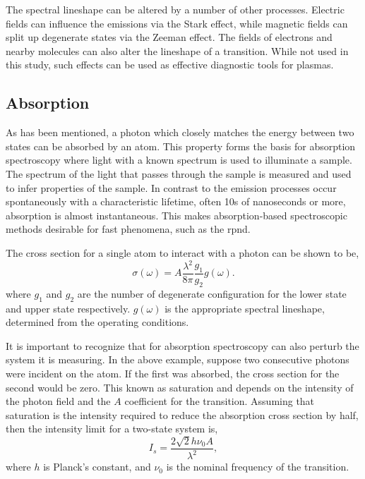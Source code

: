 The spectral lineshape can be altered by a number of other processes. Electric
fields can influence the emissions via the Stark effect, while magnetic fields
can split up degenerate states via the Zeeman effect. The fields of electrons
and nearby molecules can also alter the lineshape of a transition. While not
used in this study, such effects can be used as effective diagnostic tools for
plasmas.

\subsection{Absorption}

As has been mentioned, a photon which closely matches the energy between two
states can be absorbed by an atom. This property forms the basis for absorption
spectroscopy where light with a known spectrum is used to illuminate a sample.
The spectrum of the light that passes through the sample is measured and used to
infer properties of the sample. In contrast to the emission processes occur
spontaneously with a characteristic lifetime, often 10s of nanoseconds or more,
absorption is almost instantaneous. This makes absorption-based spectroscopic
methods desirable for fast phenomena, such as the \acs{rpnd}.

The cross section for a single atom to interact with a photon can be shown
\cite{Siegman1986} to be,
\begin{equation}
  \sigma(\omega) = A \frac{\lambda^2}{8\pi}\frac{g_1}{g_2}g(\omega).
\end{equation}
where $g_1$ and $g_2$ are the number of degenerate configuration for the lower
state and upper state respectively. $g(\omega)$ is the appropriate spectral
lineshape, determined from the operating conditions.

It is important to recognize that for absorption spectroscopy can also perturb
the system it is measuring. In the above example, suppose two consecutive
photons were incident on the atom. If the first was absorbed, the cross section
for the second would be zero. This known as saturation and depends on the
intensity of the photon field and the $A$ coefficient for the transition.
Assuming that saturation is the intensity required to reduce the absorption
cross section by half, then the intensity limit for a two-state system is,
\begin{equation}
  I_s = \frac{2\sqrt{2}h\nu_0A}{\lambda^2},
\end{equation}
where $h$ is Planck's constant, and $\nu_0$ is the nominal frequency of the
transition.
